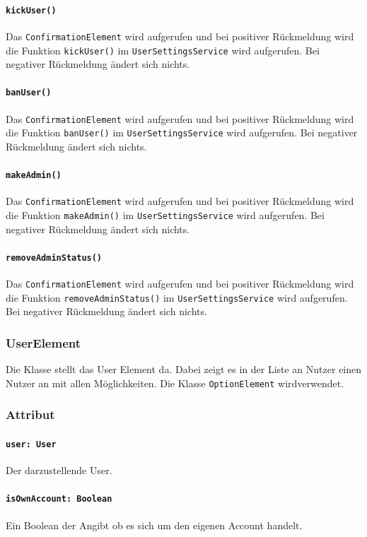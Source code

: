 \documentclass{entwurfsheft}
\begin{document}
            \paragraph*{\texttt{kickUser()}} Das \texttt{ConfirmationElement} wird aufgerufen und bei positiver Rückmeldung wird die Funktion \texttt{kickUser()} im \texttt{UserSettingsService} wird aufgerufen. Bei negativer Rückmeldung ändert sich nichts.
            \paragraph*{\texttt{banUser()}} Das \texttt{ConfirmationElement} wird aufgerufen und bei positiver Rückmeldung wird die Funktion \texttt{banUser()} im \texttt{UserSettingsService} wird aufgerufen. Bei negativer Rückmeldung ändert sich nichts.
            \paragraph*{\texttt{makeAdmin()}} Das \texttt{ConfirmationElement} wird aufgerufen und bei positiver Rückmeldung wird die Funktion \texttt{makeAdmin()} im \texttt{UserSettingsService} wird aufgerufen. Bei negativer Rückmeldung ändert sich nichts.
            \paragraph*{\texttt{removeAdminStatus()}} Das \texttt{ConfirmationElement} wird aufgerufen und bei positiver Rückmeldung wird die Funktion \texttt{removeAdminStatus()} im \texttt{UserSettingsService} wird aufgerufen. Bei negativer Rückmeldung ändert sich nichts.

    \subsubsection{UserElement} 
        Die Klasse stellt das User Element da. Dabei zeigt es in der Liste an Nutzer einen Nutzer an mit allen Möglichkeiten. Die Klasse \texttt{OptionElement} wirdverwendet.
        \subsubsection*{Attribut}
            \paragraph*{\texttt{user: User}} Der darzustellende User.
            \paragraph*{\texttt{isOwnAccount: Boolean}} Ein Boolean der Angibt ob es sich um den eigenen Account handelt.
\end{document}
